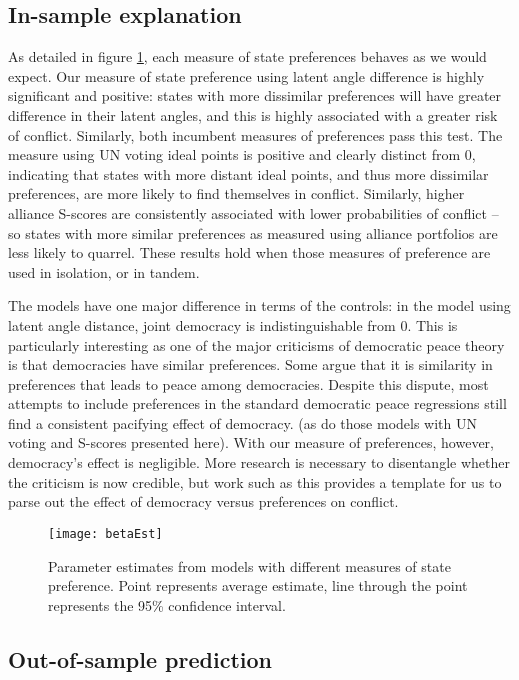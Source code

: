 \subsection*{In-sample explanation}

As detailed in figure \ref{fig:coefP}, each measure of state preferences behaves as we would expect. Our measure of state preference using latent angle difference is highly significant and positive: states with more dissimilar preferences will have greater difference in their latent angles, and this is highly associated with a greater risk of conflict. Similarly, both incumbent measures of preferences pass this test. The measure using UN voting ideal points is positive and clearly distinct from $0$, indicating that states with more distant ideal points, and thus more dissimilar preferences, are more likely to find themselves in conflict. Similarly, higher alliance S-scores are consistently associated with lower probabilities of conflict -- so states with more similar preferences as measured using alliance portfolios are less likely to quarrel. These results hold when those measures of preference are used in isolation, or in tandem.

The models have one major difference in terms of the controls: in the model using latent angle distance, joint democracy is indistinguishable from $0$. This is particularly interesting as one of the major criticisms of democratic peace theory is that democracies have similar preferences. Some argue that it is similarity in preferences that leads to peace among democracies.  Despite this dispute, most attempts to include preferences in the standard democratic peace regressions still find a consistent pacifying effect of democracy.
(as do those models with UN voting and S-scores presented here). With our measure of preferences, however, democracy's effect is negligible. More research is necessary to disentangle whether the criticism is now credible, but work such as this provides a template for us to parse out the effect of democracy versus preferences on conflict.


\begin{figure}[ht]
	\centering
	\texttt{[image: betaEst]}
	\caption{Parameter estimates from models with different measures of state preference. Point represents average estimate, line through the point represents the 95\% confidence interval.}
	\label{fig:coefP}
\end{figure}
\FloatBarrier

\subsection*{Out-of-sample prediction}

